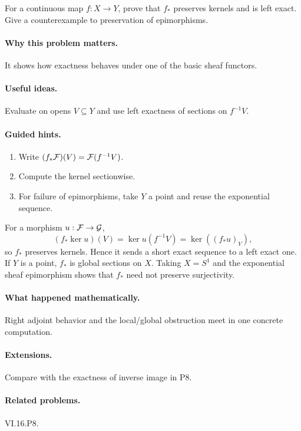 \begin{problem}\label{prob:vi16-p07}
For a continuous map $f:X\to Y$, prove that $f_*$ preserves kernels and is left exact.  Give a counterexample to preservation of epimorphisms.
\end{problem}

\ifdefined\FullProblemDossiers
\paragraph{Why this problem matters.}
It shows how exactness behaves under one of the basic sheaf functors.

\paragraph{Useful ideas.}
Evaluate on opens $V\subseteq Y$ and use left exactness of sections on $f^{-1}V$.

\paragraph{Guided hints.}
\begin{enumerate}
\item Write $(f_*\mathcal F)(V)=\mathcal F(f^{-1}V)$.
\item Compute the kernel sectionwise.
\item For failure of epimorphisms, take $Y$ a point and reuse the exponential sequence.
\end{enumerate}

\begin{solution}
For a morphism $u:\mathcal F\to\mathcal G$,
\[
(f_*\ker u)(V)=\ker u(f^{-1}V)=\ker((f_*u)_V),
\]
so $f_*$ preserves kernels.  Hence it sends a short exact sequence to a left exact one.  If $Y$ is a point, $f_*$ is global sections on $X$.  Taking $X=S^1$ and the exponential sheaf epimorphism shows that $f_*$ need not preserve surjectivity.
\end{solution}

\paragraph{What happened mathematically.}
Right adjoint behavior and the local/global obstruction meet in one concrete computation.

\paragraph{Extensions.}
Compare with the exactness of inverse image in P8.

\paragraph{Related problems.}
VI.16.P8.
\fi
